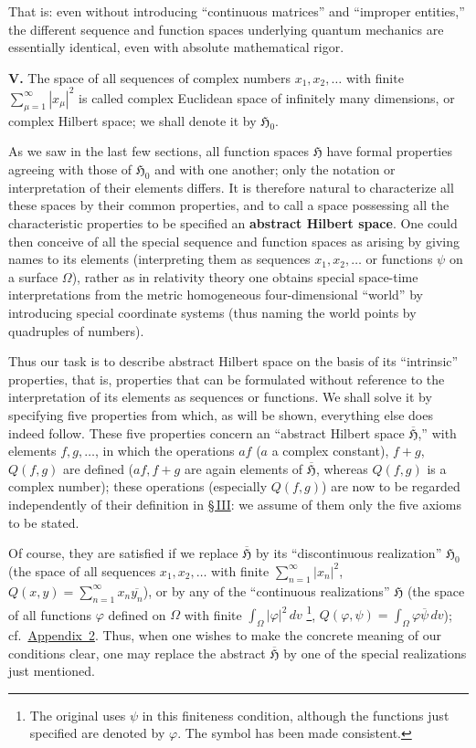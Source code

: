 \documentclass[fontsize=13pt,paper=b5,twoside,bookmarkpackage=false]{scrartcl}
\newcommand{\articleSection}[1]{%
  \par\addvspace{\medskipamount}\phantomsection\label{sec:#1}%
  \pdfbookmark[1]{Section #1}{section-#1}%
  \noindent\textbf{#1.}\enspace\ignorespaces}
\newcommand{\Sec}[1]{\hyperref[sec:#1]{\S\,#1}}
\newcommand{\App}[1]{\hyperref[app:#1]{Appendix~#1}}
\newcounter{translatornote}
\newcommand{\tnote}[1]{%
  \begingroup\stepcounter{translatornote}%
  \renewcommand{\thefootnote}{T\arabic{translatornote}}%
  \footnote[0]{#1}\endgroup}
\begin{document}
That is: even without introducing ``continuous matrices'' and ``improper entities,'' the different sequence and function spaces underlying quantum mechanics are essentially identical, even with absolute mathematical rigor.

\articleSection{V}
The space of all sequences of complex numbers $x_1,x_2,\ldots$ with finite $\sum_{\mu=1}^{\infty}|x_\mu|^2$ is called complex Euclidean space of infinitely many dimensions, or complex Hilbert space; we shall denote it by $\mathfrak{H}_0$.

As we saw in the last few sections, all function spaces $\mathfrak{H}$ have formal properties agreeing with those of $\mathfrak{H}_0$ and with one another; only the notation or interpretation of their elements differs. It is therefore natural to characterize all these spaces by their common properties, and to call a space possessing all the characteristic properties to be specified an \textbf{abstract Hilbert space}. One could then conceive of all the special sequence and function spaces as arising by giving names to its elements (interpreting them as sequences $x_1,x_2,\ldots$ or functions $\psi$ on a surface $\Omega$), rather as in relativity theory one obtains special space-time interpretations from the metric homogeneous four-dimensional ``world'' by introducing special coordinate systems (thus naming the world points by quadruples of numbers).

Thus our task is to describe abstract Hilbert space on the basis of its ``intrinsic'' properties, that is, properties that can be formulated without reference to the interpretation of its elements as sequences or functions. We shall solve it by specifying five properties from which, as will be shown, everything else does indeed follow. These five properties concern an ``abstract Hilbert space $\overline{\mathfrak{H}}$,'' with elements $f,g,\ldots$, in which the operations $af$ ($a$ a complex constant), $f+g$, $Q(f,g)$ are defined ($af,f+g$ are again elements of $\overline{\mathfrak{H}}$, whereas $Q(f,g)$ is a complex number); these operations (especially $Q(f,g)$) are now to be regarded independently of their definition in \Sec{III}: we assume of them only the five axioms to be stated.

Of course, they are satisfied if we replace $\overline{\mathfrak{H}}$ by its ``discontinuous realization'' $\mathfrak{H}_0$ (the space of all sequences $x_1,x_2,\ldots$ with finite $\sum_{n=1}^{\infty}|x_n|^2$, $Q(x,y)=\sum_{n=1}^{\infty}x_n\overline{y_n}$), or by any of the ``continuous realizations'' $\mathfrak{H}$ (the space of all functions $\varphi$ defined on $\Omega$ with finite $\int_\Omega|\varphi|^2\,dv$\tnote{The original uses $\psi$ in this finiteness condition, although the functions just specified are denoted by $\varphi$. The symbol has been made consistent.}, $Q(\varphi,\psi)=\int_\Omega\varphi\overline{\psi}\,dv$); cf.\ \App{2}. Thus, when one wishes to make the concrete meaning of our conditions clear, one may replace the abstract $\overline{\mathfrak{H}}$ by one of the special realizations just mentioned.
\end{document}
